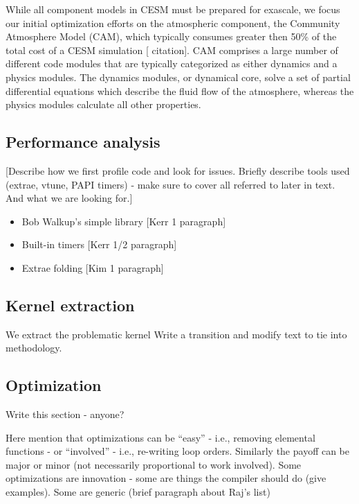 While all component models in CESM must be prepared for exascale, we focus our initial 
optimization efforts on the atmospheric component, the Community Atmosphere Model (CAM), which typically consumes greater then 50\% of the total cost of a CESM simulation [{\color{red} citation}].  CAM comprises a large number of different code modules that are typically  categorized as either dynamics and a physics modules.  The dynamics modules, or dynamical core, solve a set of partial differential equations which describe the fluid flow of the atmosphere, whereas the physics modules calculate all other properties.  




\subsection{Performance analysis}

[{\color{red}Describe how we first profile code and look for issues.  Briefly describe tools used (extrae, vtune, PAPI timers) - make sure to cover all referred to later in text.  And what we are looking for.}]

{\color{red}
 \begin{itemize}
   \item {Bob Walkup's simple library} [Kerr 1 paragraph]
   \item {Built-in timers} [Kerr 1/2 paragraph]
   \item {Extrae folding} [Kim 1 paragraph]
 \end{itemize}
}


\subsection{Kernel extraction}

We extract the problematic kernel {\color{red} Write a transition and modify text to tie into methodology}.  



\subsection{Optimization}

 {\color{red} Write this section - anyone?}

Here mention that optimizations can be ``easy'' - i.e., removing elemental functions - or ``involved'' - i.e., re-writing loop orders.  Similarly the payoff can be major or minor (not necessarily proportional to work involved).
Some optimizations are innovation - some are things the compiler should do (give examples).  Some are generic (brief paragraph about Raj's list)


